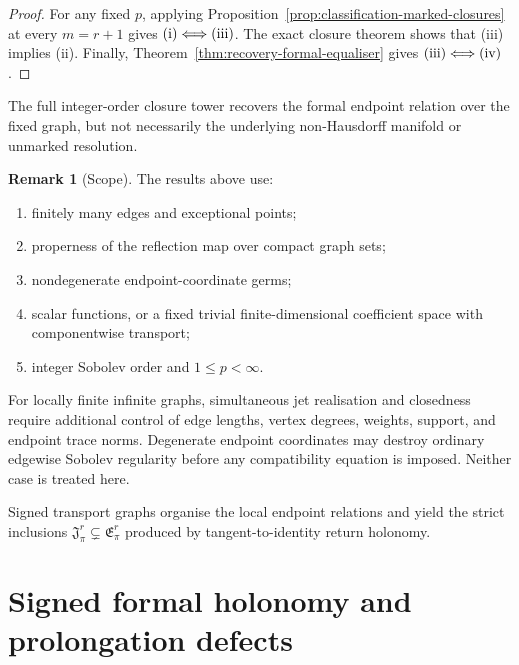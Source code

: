 \documentclass[11pt]{article}
\theoremstyle{plain}
\theoremstyle{definition}
\newtheorem{remark}[theorem]{Remark}
\begin{document}
\begin{proof}
For any fixed \(p\), applying
Proposition~\ref{prop:classification-marked-closures}
at every \(m=r+1\) gives
\(\textup{(i)} \Longleftrightarrow \textup{(iii)}\).
The exact closure theorem shows that \textup{(iii)} implies
\textup{(ii)}. Finally,
Theorem~\ref{thm:recovery-formal-equaliser}
gives
\(\textup{(iii)} \Longleftrightarrow \textup{(iv)}\).
\end{proof}

The full integer-order closure tower recovers the formal endpoint relation over the fixed graph, but not necessarily the underlying non-Hausdorff manifold or unmarked resolution.

\begin{remark}[Scope]
\label{rem:graph-resolution-scope}
The results above use:

\begin{enumerate}[label=\textup{(\roman*)}]
  \item finitely many edges and exceptional points;

  \item properness of the reflection map over compact graph sets;

  \item nondegenerate endpoint-coordinate germs;

  \item scalar functions, or a fixed trivial finite-dimensional
        coefficient space with componentwise transport;

  \item integer Sobolev order and
        \(1\leq p<\infty\).
\end{enumerate}

For locally finite infinite graphs, simultaneous jet realisation and
closedness require additional control of edge lengths, vertex degrees,
weights, support, and endpoint trace norms. Degenerate endpoint
coordinates may destroy ordinary edgewise Sobolev regularity before any
compatibility equation is imposed. Neither case is treated here.

Signed transport graphs organise the local endpoint relations and yield the
strict inclusions \(\mathfrak J_\pi^r \subsetneq \mathfrak E_\pi^r\) produced by tangent-to-identity return holonomy.
\end{remark}
\section{Signed formal holonomy and prolongation defects}
\label{sec:formal-holonomy}
\end{document}
